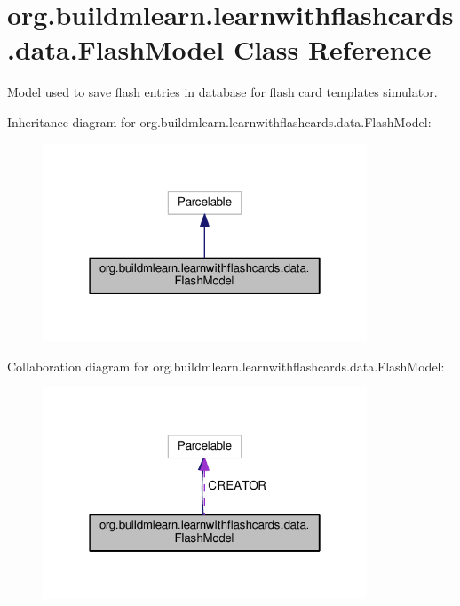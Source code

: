 \hypertarget{classorg_1_1buildmlearn_1_1learnwithflashcards_1_1data_1_1FlashModel}{}\section{org.\+buildmlearn.\+learnwithflashcards.\+data.\+Flash\+Model Class Reference}
\label{classorg_1_1buildmlearn_1_1learnwithflashcards_1_1data_1_1FlashModel}


Model used to save flash entries in database for flash card template\textquotesingle{}s simulator.  




Inheritance diagram for org.\+buildmlearn.\+learnwithflashcards.\+data.\+Flash\+Model\+:
\nopagebreak
\begin{figure}[H]
\begin{center}
\leavevmode
\includegraphics[width=274pt]{classorg_1_1buildmlearn_1_1learnwithflashcards_1_1data_1_1FlashModel__inherit__graph}
\end{center}
\end{figure}


Collaboration diagram for org.\+buildmlearn.\+learnwithflashcards.\+data.\+Flash\+Model\+:
\nopagebreak
\begin{figure}[H]
\begin{center}
\leavevmode
\includegraphics[width=274pt]{classorg_1_1buildmlearn_1_1learnwithflashcards_1_1data_1_1FlashModel__coll__graph}
\end{center}
\end{figure}
